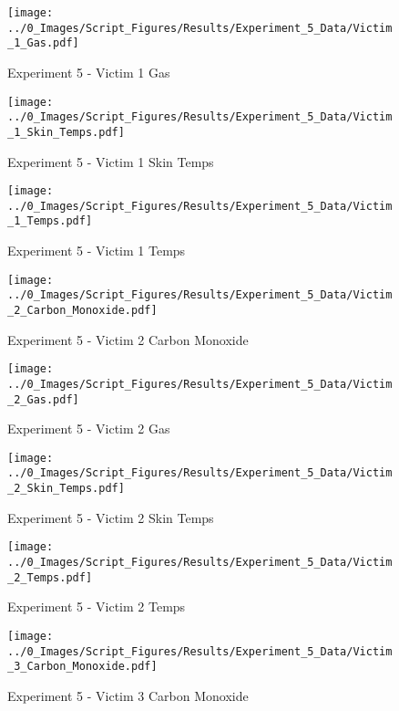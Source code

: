 	\clearpage

	\begin{figure}[H]
		\centering
		\texttt{[image: ../0\_Images/Script\_Figures/Results/Experiment\_5\_Data/Victim\_1\_Gas.pdf]}
		\caption[]{Experiment 5 - Victim 1 Gas}
	\end{figure}
 

	\begin{figure}[H]
		\centering
		\texttt{[image: ../0\_Images/Script\_Figures/Results/Experiment\_5\_Data/Victim\_1\_Skin\_Temps.pdf]}
		\caption[]{Experiment 5 - Victim 1 Skin Temps}
	\end{figure}
 
	\clearpage

	\begin{figure}[H]
		\centering
		\texttt{[image: ../0\_Images/Script\_Figures/Results/Experiment\_5\_Data/Victim\_1\_Temps.pdf]}
		\caption[]{Experiment 5 - Victim 1 Temps}
	\end{figure}
 

	\begin{figure}[H]
		\centering
		\texttt{[image: ../0\_Images/Script\_Figures/Results/Experiment\_5\_Data/Victim\_2\_Carbon\_Monoxide.pdf]}
		\caption[]{Experiment 5 - Victim 2 Carbon Monoxide}
	\end{figure}
 
	\clearpage

	\begin{figure}[H]
		\centering
		\texttt{[image: ../0\_Images/Script\_Figures/Results/Experiment\_5\_Data/Victim\_2\_Gas.pdf]}
		\caption[]{Experiment 5 - Victim 2 Gas}
	\end{figure}
 

	\begin{figure}[H]
		\centering
		\texttt{[image: ../0\_Images/Script\_Figures/Results/Experiment\_5\_Data/Victim\_2\_Skin\_Temps.pdf]}
		\caption[]{Experiment 5 - Victim 2 Skin Temps}
	\end{figure}
 
	\clearpage

	\begin{figure}[H]
		\centering
		\texttt{[image: ../0\_Images/Script\_Figures/Results/Experiment\_5\_Data/Victim\_2\_Temps.pdf]}
		\caption[]{Experiment 5 - Victim 2 Temps}
	\end{figure}
 

	\begin{figure}[H]
		\centering
		\texttt{[image: ../0\_Images/Script\_Figures/Results/Experiment\_5\_Data/Victim\_3\_Carbon\_Monoxide.pdf]}
		\caption[]{Experiment 5 - Victim 3 Carbon Monoxide}
	\end{figure}
 
